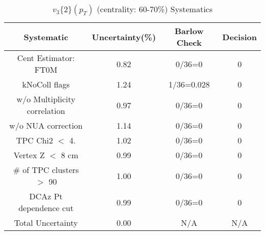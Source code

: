 \begin{table}[htbp]
\caption{$v_3\{2\}(p_{T})$ (centrality: 60-70\%) Systematics}
\label{tab:Sys_pTDiffv3}
\centering
\begin{tabular}{|c|c|c|c|}
\hline
Systematic & Uncertainty(\%) & Barlow Check & Decision \\
\hline
Cent Estimator: FT0M & 0.82 & 0/36=0 & 0 \\
kNoColl flags & 1.24 & 1/36=0.028 & 0 \\
w/o Multiplicity correlation & 0.97 & 0/36=0 & 0 \\
w/o NUA correction & 1.14 & 0/36=0 & 0 \\
TPC Chi2 $<$ 4. & 1.02 & 0/36=0 & 0 \\
Vertex Z $<$ 8 cm & 0.99 & 0/36=0 & 0 \\
\# of TPC clusters $>$ 90 & 1.00 & 0/36=0 & 0 \\
DCAz Pt dependence cut & 0.99 & 0/36=0 & 0 \\
\hline
Total Uncertainty & 0.00 & N/A & N/A \\
\hline
\end{tabular}
\end{table}
